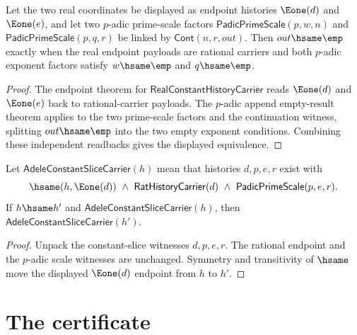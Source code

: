 \begin{theorem}
\label{thm:adele-real-padic-e1-append-empty-padic-result}
Let the two real coordinates be displayed as endpoint histories
\(\Eone(d)\) and \(\Eone(e)\), and let two \(p\)-adic prime-scale factors
\(\mathsf{PadicPrimeScale}(p,w,n)\) and
\(\mathsf{PadicPrimeScale}(p,q,r)\) be linked by
\(\mathsf{Cont}(n,r,out)\). Then \(out\hsame\emp\) exactly when the real
endpoint payloads are rational carriers and both \(p\)-adic exponent factors
satisfy \(w\hsame\emp\) and \(q\hsame\emp\).
\end{theorem}
\begin{proof}
The endpoint theorem for \(\mathsf{RealConstantHistoryCarrier}\) reads
\(\Eone(d)\) and \(\Eone(e)\) back to rational-carrier payloads. The
\(p\)-adic append empty-result theorem applies to the two prime-scale factors
and the continuation witness, splitting \(out\hsame\emp\) into the two empty
exponent conditions. Combining these independent readbacks gives the displayed
equivalence.
\end{proof}

\begin{theorem}
\label{thm:adele-constant-slice-carrier-hsame-transport}
Let $\mathsf{AdeleConstantSliceCarrier}(h)$ mean that histories $d,p,e,r$
exist with
$$
\hsame(h,\Eone(d))\ \wedge\ \mathsf{RatHistoryCarrier}(d)\ \wedge\
\mathsf{PadicPrimeScale}(p,e,r).
$$
If $h\hsame h'$ and $\mathsf{AdeleConstantSliceCarrier}(h)$, then
$\mathsf{AdeleConstantSliceCarrier}(h')$.
\end{theorem}
\begin{proof}
Unpack the constant-slice witnesses $d,p,e,r$. The rational endpoint and the
$p$-adic scale witnesses are unchanged. Symmetry and transitivity of $\hsame$
move the displayed $\Eone(d)$ endpoint from $h$ to $h'$.
\end{proof}

\section{The certificate}
\label{sec:adele-certificate}

